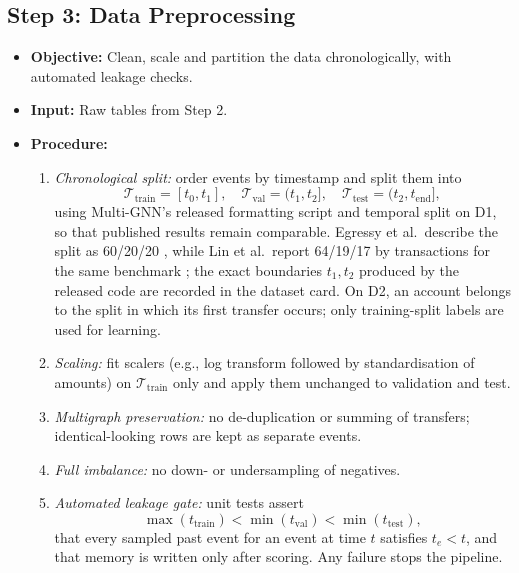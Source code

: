 \documentclass[11pt,a4paper]{article}
\begin{document}
\subsection{Step 3: Data Preprocessing}
\begin{itemize}[leftmargin=*]
    \item \textbf{Objective:} Clean, scale and partition the data chronologically, with automated leakage checks.
    \item \textbf{Input:} Raw tables from Step 2.
    \item \textbf{Procedure:}
    \begin{enumerate}[leftmargin=*]
        \item \textit{Chronological split:} order events by timestamp and split them into
        \begin{equation}
            \mathcal{T}_{\text{train}} = [t_0, t_1], \quad \mathcal{T}_{\text{val}} = (t_1, t_2], \quad \mathcal{T}_{\text{test}} = (t_2, t_{\text{end}}],
        \end{equation}
        using Multi-GNN's released formatting script and temporal split on D1, so that published results remain comparable. Egressy et al.\ describe the split as 60/20/20 \cite{egressy2024multigraph}, while Lin et al.\ report 64/19/17 by transactions for the same benchmark \cite{lin2024fraudgt}; the exact boundaries $t_1, t_2$ produced by the released code are recorded in the dataset card. On D2, an account belongs to the split in which its first transfer occurs; only training-split labels are used for learning.
        \item \textit{Scaling:} fit scalers (e.g., log transform followed by standardisation of amounts) on $\mathcal{T}_{\text{train}}$ only and apply them unchanged to validation and test.
        \item \textit{Multigraph preservation:} no de-duplication or summing of transfers; identical-looking rows are kept as separate events.
        \item \textit{Full imbalance:} no down- or undersampling of negatives.
        \item \textit{Automated leakage gate:} unit tests assert
        \begin{equation}
            \max(t_{\text{train}}) < \min(t_{\text{val}}) < \min(t_{\text{test}}),
        \end{equation}
        that every sampled past event for an event at time $t$ satisfies $t_e < t$, and that memory is written only after scoring. Any failure stops the pipeline.

\end{enumerate}
\end{itemize}
\end{document}
